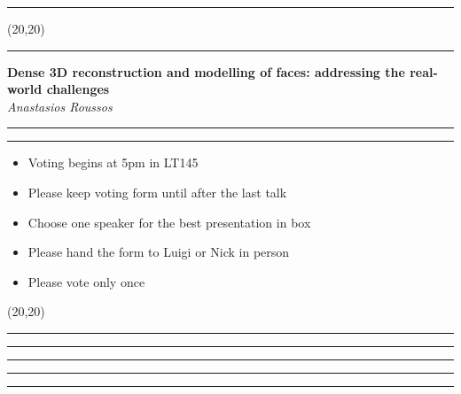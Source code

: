 \documentclass[11pt]{article}
\newcommand{\talk}[1]{\Large\flushleft\textbf{#1}\\}
\newcommand{\speaker}[1]{\textit{#1}\\}
\newcommand{\separator}{\noindent\rule{\linewidth}{0.1mm}}
\newcommand{\votebox}{\vspace{-5cm}\noindent\hfill\framebox(20,20){}}
\newcommand{\hstrut}{\noindent\color{iclightblue}\rule{\linewidth}{0pt}}
\begin{document}
\begin{minipage}[b]{0.02\linewidth}
\hstrut%
\end{minipage}
\begin{minipage}[b]{0.49\linewidth}
\votebox%
\end{minipage}
\noindent
\begin{minipage}[t]{0.49\linewidth}
\separator%
\talk{Dense 3D reconstruction and modelling of faces: addressing the real-world
      challenges}
\speaker{Anastasios Roussos}
\end{minipage}
\begin{minipage}[t]{0.02\linewidth}
\hstrut%
\end{minipage}
\begin{minipage}[t]{0.49\linewidth}
\separator%

{\it
\begin{itemize}
  \item Voting begins at 5pm in LT145
  \item Please keep voting form until after the last talk
  \item Choose one speaker for the best presentation in box
  \item Please hand the form to Luigi or Nick in person
  \item Please vote only once
\end{itemize}
}
\end{minipage}
\vfill
\noindent
\begin{minipage}[b]{0.49\linewidth}
\votebox%
\end{minipage}
\begin{minipage}[b]{0.02\linewidth}
\hstrut%
\end{minipage}
\begin{minipage}[b]{0.49\linewidth}
\hstrut%
\end{minipage}
\noindent
\begin{minipage}[t]{0.49\linewidth}
\separator%
\vfill
\end{minipage}
\begin{minipage}[t]{0.02\linewidth}
\hstrut%
\end{minipage}
\begin{minipage}[t]{0.49\linewidth}
\hstrut%
\end{minipage}
\end{document}
